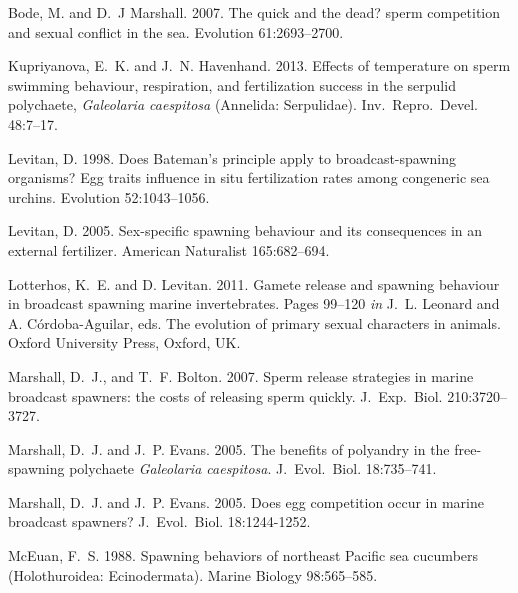 \documentclass{article}
\begin{document}
\begin{thebibliography}{}

Bode, M. and D.~J Marshall. 2007.
\newblock The quick and the dead? sperm competition and sexual conflict in the sea.
\newblock Evolution 61:2693--2700.

Kupriyanova, E.~K. and J.~N. Havenhand. 2013.
\newblock Effects of temperature on sperm swimming behaviour, respiration, and fertilization success in the serpulid polychaete, \textit{Galeolaria caespitosa} (Annelida: Serpulidae).
\newblock Inv.~Repro.~Devel. 48:7--17.

Levitan, D. 1998.
\newblock Does Bateman's principle apply to broadcast-spawning organisms? Egg traits influence in situ fertilization rates among congeneric sea urchins.
\newblock Evolution 52:1043--1056.

Levitan, D. 2005.
\newblock Sex-specific spawning behaviour and its consequences in an external fertilizer.
\newblock American Naturalist 165:682--694.

Lotterhos, K.~E. and D. Levitan. 2011.
\newblock Gamete release and spawning behaviour in broadcast spawning marine invertebrates.
\newblock Pages 99--120 \emph{in} J.~L. Leonard and A. C\'{o}rdoba-Aguilar, eds. The evolution of primary sexual characters in animals. Oxford University Press, Oxford, UK.

Marshall, D.~J., and T.~F. Bolton. 2007.
\newblock Sperm release strategies in marine broadcast spawners: the costs of releasing sperm quickly.
\newblock J.~Exp.~Biol. 210:3720--3727.

Marshall, D.~J. and J.~P. Evans. 2005.
\newblock The benefits of polyandry in the free-spawning polychaete \textit{Galeolaria caespitosa}.
\newblock J.~Evol.~Biol. 18:735--741.

Marshall, D.~J. and J.~P. Evans. 2005.
\newblock Does egg competition occur in marine broadcast spawners? 
\newblock J.~Evol.~Biol. 18:1244-1252.

McEuan, F.~S. 1988.
\newblock Spawning behaviors of northeast Pacific sea cucumbers (Holothuroidea: Ecinodermata).
\newblock Marine Biology 98:565--585.


\end{thebibliography}
\end{document}
